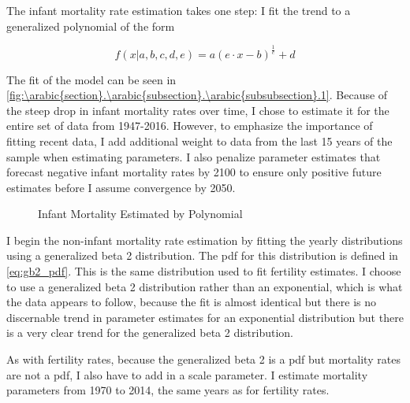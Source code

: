 \documentclass[10pt]{article}
\renewcommand{\thesection}{\arabic{section}}
\renewcommand{\thesubsection}{\thesection.\arabic{subsection}}
\renewcommand{\thesubsubsection}{\thesubsection.\arabic{subsubsection}}
\numberwithin{equation}{subsection}
\newcommand*{\FigureDir}{../../graphs}
\begin{document}
\par The infant mortality rate estimation takes one step: I fit the trend to a generalized polynomial of the form

\begin{equation}
   f(x|a, b, c, d, e) = a (e \cdot x - b)^{\frac{1}{c}} + d
\end{equation}

\par The fit of the model can be seen in \autoref{fig:\thesubsubsection.1}. Because of the steep drop in infant mortality rates over time, I chose to estimate it for the entire set of data from 1947-2016. However, to emphasize the importance of fitting recent data, I add additional weight to data from the last 15 years of the sample when estimating parameters. I also penalize parameter estimates that forecast negative infant mortality rates by 2100 to ensure only positive future estimates before I assume convergence by 2050.

\begin{figure}[!ht]
   \centering
   \caption{\label{fig:\thesubsubsection.1}Infant Mortality Estimated by Polynomial}
\end{figure}

\par I begin the non-infant mortality rate estimation by fitting the yearly distributions using a generalized beta 2 distribution. The pdf for this distribution is defined in \ref{eq:gb2_pdf}. This is the same distribution used to fit fertility estimates. I choose to use a generalized beta 2 distribution rather than an exponential, which is what the data appears to follow, because the fit is almost identical but there is no discernable trend in parameter estimates for an exponential distribution but there is a very clear trend for the generalized beta 2 distribution.

\par As with fertility rates, because the generalized beta 2 is a pdf but mortality rates are not a pdf, I also have to add in a scale parameter. I estimate mortality parameters from 1970 to 2014, the same years as for fertility rates.
\end{document}
